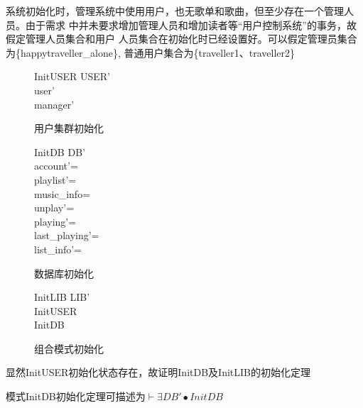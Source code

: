 \documentclass[14pt]{article}
\numberwithin{figure}{subsection}
\begin{document}
系统初始化时，管理系统中使用用户，也无歌单和歌曲，但至少存在一个管理人员。由于需求
中并未要求增加管理人员和增加读者等“用户控制系统”的事务，故假定管理人员集合和用户
人员集合在初始化时已经设置好。可以假定管理员集合为\{happytraveller\_alone\},
普通用户集合为\{traveller1、traveller2\}
\vspace{-0.5cm}
\begin{figure}[H]
    \setlength{\abovecaptionskip}{0.cm}
    \setlength{\belowcaptionskip}{0.cm}
    \begin{schema}{InitUSER}
        USER'\\
        \where
        user' \neq \emptyset\\
        manager' \neq \emptyset\\
    \end{schema}
    \caption{用户集群初始化}
\end{figure}
\vspace{-1.5cm}
\begin{figure}[H]
    \setlength{\abovecaptionskip}{0.cm}
    \setlength{\belowcaptionskip}{0.cm}
    \begin{schema}{InitDB}
        DB'\\
        \where
        account'=\emptyset\\
        playlist'=\emptyset \\
        music\_info=\emptyset \\
        unplay'=\emptyset \\
        playing'=\emptyset \\
        last\_playing'=\emptyset\\
        list\_info'=\emptyset
    \end{schema}
    \caption{数据库初始化}
\end{figure}
\vspace{-1.5cm}
\begin{figure}[H]
    \setlength{\abovecaptionskip}{0.cm}
    \setlength{\belowcaptionskip}{0.cm}
    \begin{schema}{InitLIB}
        LIB'\\
        \where
        InitUSER \\
        InitDB \\
    \end{schema}
    \caption{组合模式初始化}
\end{figure}
\vspace{-0.3cm}
显然InitUSER初始化状态存在，故证明InitDB及InitLIB的初始化定理

模式InitDB初始化定理可描述为$\vdash \exists DB' \bullet InitDB$
\end{document}
